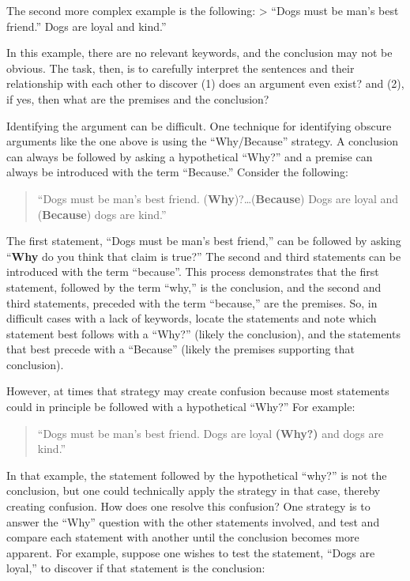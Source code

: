 \documentclass[
]{book}
\begin{document}
\begin{reflect}
The second more complex example is the following:
\textgreater{} ``Dogs must be man's best friend.'' Dogs are loyal and kind.''

In this example, there are no relevant keywords, and the conclusion may not be obvious. The task, then, is to carefully interpret the sentences and their relationship with each other to discover (1) does an argument even exist? and (2), if yes, then what are the premises and the conclusion?

Identifying the argument can be difficult. One technique for identifying obscure arguments like the one above is using the ``Why/Because'' strategy. A conclusion can always be followed by asking a hypothetical ``Why?'' and a premise can always be introduced with the term ``Because.'' Consider the following:

\begin{quote}
``Dogs must be man's best friend. (\textbf{Why})?\ldots(\textbf{Because}) Dogs are loyal and (\textbf{Because}) dogs are kind.''
\end{quote}

The first statement, ``Dogs must be man's best friend,'' can be followed by asking ``\textbf{Why} do you think that claim is true?'' The second and third statements can be introduced with the term ``because''. This process demonstrates that the first statement, followed by the term ``why,'' is the conclusion, and the second and third statements, preceded with the term ``because,'' are the premises. So, in difficult cases with a lack of keywords, locate the statements and note which statement best follows with a ``Why?'' (likely the conclusion), and the statements that best precede with a ``Because'' (likely the premises supporting that conclusion).

However, at times that strategy may create confusion because most statements could in principle be followed with a hypothetical ``Why?'' For example:

\begin{quote}
``Dogs must be man's best friend. Dogs are loyal \textbf{(Why?)} and dogs are kind.''
\end{quote}

In that example, the statement followed by the hypothetical ``why?'' is not the conclusion, but one could technically apply the strategy in that case, thereby creating confusion. How does one resolve this confusion? One strategy is to answer the ``Why'' question with the other statements involved, and test and compare each statement with another until the conclusion becomes more apparent. For example, suppose one wishes to test the statement, ``Dogs are loyal,'' to discover if that statement is the conclusion:


\end{reflect}
\end{document}
